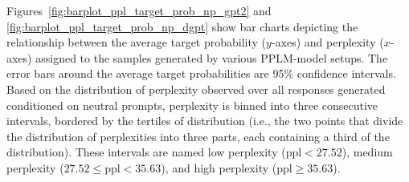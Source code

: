 Figures~\ref{fig:barplot_ppl_target_prob_np_gpt2} and \ref{fig:barplot_ppl_target_prob_np_dgpt} show bar charts depicting the relationship between the average target probability ($y$-axes) and perplexity ($x$-axes) assigned to the samples generated by various PPLM-model setups. The error bars around the average target probabilities are 95\% confidence intervals. Based on the distribution of perplexity observed over all responses generated conditioned on neutral prompts, perplexity is binned into three consecutive intervals, bordered by the tertiles of distribution (i.e., the two points that divide the distribution of perplexities into three parts, each containing a third of the distribution). These intervals are named low perplexity ($\text{ppl}<27.52$), medium perplexity ($27.52 \leq \text{ppl} < 35.63$), and high perplexity ($\text{ppl}\geq35.63$).

